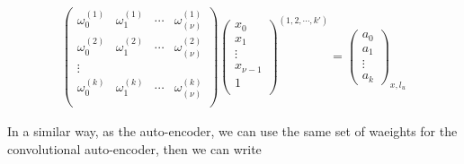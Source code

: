 \documentclass[final, paper=letter,5p,times,twocolumn]{elsarticle}
\begin{document}
\begin{eqnarray*}
  \left(
  \begin{array}{cccc}
    \omega_{0}^{(1)} & \omega_{1}^{(1)} & \cdots & \omega_{(\nu)}^{(1)} \\
    \omega_{0}^{(2)} & \omega_{1}^{(2)} & \cdots & \omega_{(\nu)}^{(2)} \\
    \vdots \\
    \omega_{0}^{(k)} & \omega_{1}^{(k)} & \cdots & \omega_{(\nu)}^{(k)} \\
  \end{array}
  \right) \left(
  \begin{array}{c}
    x_{0} \\
    x_{1} \\
    \vdots \\
    x_{\nu-1} \\
    1 \\
  \end{array}
  \right)^{(1,2,\cdots,k')} = \left(
  \begin{array}{c}
    a_{0} \\
    a_{1} \\
    \vdots \\
    a_{k} 
  \end{array}
  \right)_{x,l_{u}}
\end{eqnarray*}

In a similar way, as the auto-encoder, we can use the same set of waeights for the convolutional auto-encoder, then we can write
\end{document}
